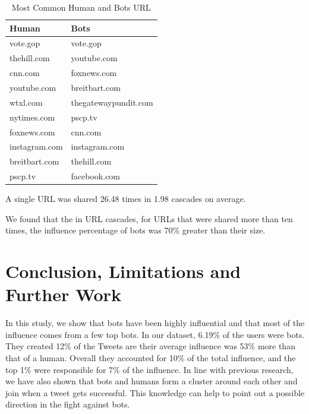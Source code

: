 \documentclass[letterpaper]{article}
\begin{document}
\begin{table}[H]
    \centering
    \begin{tabular}{|l|l|}
    \hline
    \textbf{Human} & \textbf{Bots} \\ \hline
    vote.gop & vote.gop \\ \hline
    thehill.com & youtube.com \\ \hline
    cnn.com & foxnews.com \\ \hline
    youtube.com & breitbart.com \\ \hline
    wtxl.com & thegatewaypundit.com \\ \hline
    nytimes.com & pscp.tv \\ \hline
    foxnews.com & cnn.com \\ \hline
    instagram.com & instagram.com \\ \hline
    breitbart.com & thehill.com \\ \hline
    pscp.tv & facebook.com \\ \hline
    \end{tabular}
    \caption{Most Common Human and Bots URL}
    \label{tab:common_human_bots}
\end{table}

A single URL was shared 26.48 times in 1.98 cascades on average.

We found that the in URL cascades, for URLs that were shared more than ten times, the influence percentage of bots was 70\% greater than their size.

\section{Conclusion, Limitations and Further Work}
In this study, we show that bots have been highly influential and that most of the influence comes from a few top 
bots. In our dataset, 6.19\% of the users were bots. They created 12\% of the Tweets are their average influence was 
53\% more than that of a human. Overall they accounted for 10\% of the total influence, and the top 1\% were 
responsible for 7\% of the influence. In line with previous research, we have also shown that bots 
and humans form a cluster around each other and join when a tweet gets successful. This knowledge can help to point
 out a possible direction in the fight against bots. 
\end{document}
